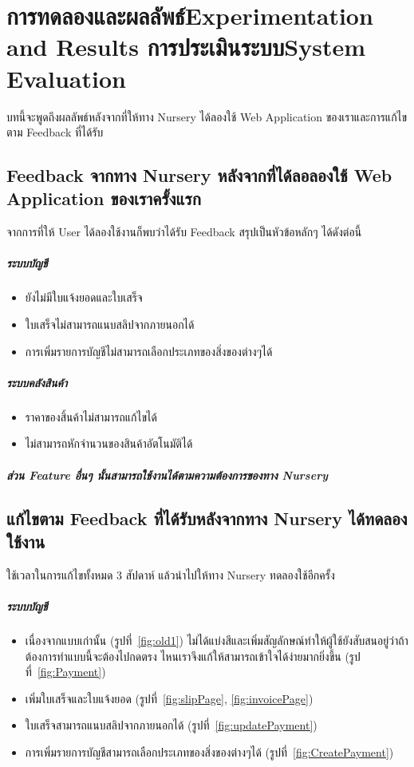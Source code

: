\chapter{\ifproject%
\ifcpe การทดลองและผลลัพธ์\else Experimentation and Results\fi
\else%
\ifcpe การประเมินระบบ\else System Evaluation\fi
\fi}
บทนี้จะพูดถึงผลลัพธ์หลังจากที่ให้ทาง Nursery ได้ลองใช้ Web Application ของเราและการแก้ไขตาม Feedback ที่ได้รับ 
\section{Feedback จากทาง Nursery หลังจากที่ได้ลอลองใช้ Web Application ของเราครั้งแรก}
จากการที่ให้ User ได้ลองใช้งานก็พบว่าได้รับ Feedback สรุปเป็นหัวข้อหลักๆ ได้ดังต่อนี้
\paragraph{ระบบบัญชี}
\begin{itemize}
    \item ยังไม่มีใบแจ้งยอดและใบเสร็จ
    \item ใบเสร็จไม่สามารถแนบสลิปจากภายนอกได้
    \item การเพิ่มรายการบัญชีไม่สามารถเลือกประเภทของสิ่งของต่างๆได้ 
\end{itemize}
\paragraph{ระบบคลังสินค้า}
\begin{itemize}
    \item ราคาของสิ้นค้าไม่สามารถแก้ไขได้
    \item ไม่สามารถหักจำนวนของสินค้าอัตโนมัติได้
\end{itemize}

\paragraph{ส่วน Feature อื่นๆ นั้นสามารถใช้งานได้ตามความต้องการของทาง Nursery}

\section{แก้ไขตาม Feedback ที่ได้รับหลังจากทาง Nursery ได้ทดลองใช้งาน}
ใช้เวลาในการแก้ไขทั้งหมด 3 สัปดาห์ แล้วนำไปให้ทาง Nursery ทดลองใช้อีกครั้ง
\paragraph{ระบบบัญชี}
\begin{itemize}
    \item เนื่องจากแบบเก่านั้น (รูปที่~\ref{fig:old1})   ไม่ได้แบ่งสีและเพิ่มสัญลักษณ์ทำให้ผู้ใช้ยังสับสนอยู่ว่าถ้าต้องการทำแบบนี้จะต้องไปกดตรง
    ไหนเราจึงแก้ให้สามารถเข้าใจได้ง่ายมากยิ่งขึ้น (รูปที่~\ref{fig:Payment})
    \item เพิ่มใบเสร็จและใบแจ้งยอด (รูปที่~\ref{fig:slipPage}, \ref{fig:invoicePage})
    \item ใบเสร็จสามารถแนบสลิปจากภายนอกได้ (รูปที่~\ref{fig:updatePayment})
    \item การเพิ่มรายการบัญชีสามารถเลือกประเภทของสิ่งของต่างๆได้ (รูปที่~\ref{fig:CreatePayment})
\end{itemize}
